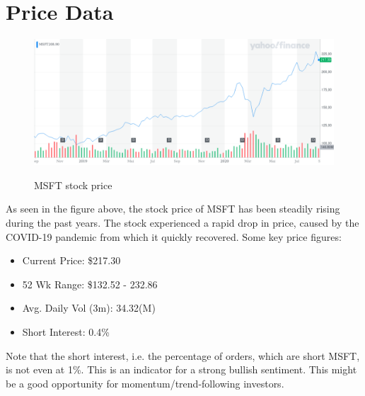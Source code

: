 \documentclass[]{article}
\begin{document}
\section{Price Data}
\begin{figure}[h]
	\centering
	\includegraphics[scale=0.35]{"MSFT_YahooFinanceChart.png"}
	\caption{MSFT stock price}
	\cite{yahoo!finance_2020}
	\label{fig:meine-grafik}
\end{figure}
\noindent As seen in the figure above, the stock price of MSFT has been steadily rising during the past years. The stock experienced a rapid drop in price, caused by the COVID-19 pandemic from which it quickly recovered. Some key price figures:
\begin{itemize}
	\item Current Price: \$217.30
	\item 52 Wk Range: \$132.52 - 232.86
	\item Avg. Daily Vol (3m): 34.32(M)
	\item Short Interest: 0.4\%
\end{itemize}
\noindent Note that the short interest, i.e. the percentage of orders, which are short MSFT, is not even at 1\%. This is an indicator for a strong bullish sentiment. This might be a good opportunity for momentum/trend-following investors.
\end{document}
